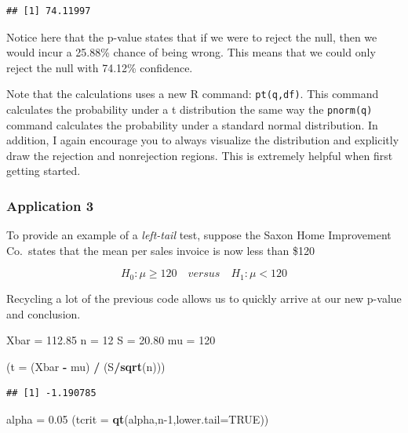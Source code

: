 \documentclass[
]{book}
\newenvironment{Shaded}{\begin{snugshade}}{\end{snugshade}}
\newcommand{\AttributeTok}[1]{\textcolor[rgb]{0.13,0.29,0.53}{#1}}
\newcommand{\ConstantTok}[1]{\textcolor[rgb]{0.56,0.35,0.01}{#1}}
\newcommand{\DecValTok}[1]{\textcolor[rgb]{0.00,0.00,0.81}{#1}}
\newcommand{\FloatTok}[1]{\textcolor[rgb]{0.00,0.00,0.81}{#1}}
\newcommand{\FunctionTok}[1]{\textcolor[rgb]{0.13,0.29,0.53}{\textbf{#1}}}
\newcommand{\NormalTok}[1]{#1}
\newcommand{\OtherTok}[1]{\textcolor[rgb]{0.56,0.35,0.01}{#1}}
\newcommand{\SpecialCharTok}[1]{\textcolor[rgb]{0.81,0.36,0.00}{\textbf{#1}}}
\begin{document}
\begin{verbatim}
## [1] 74.11997
\end{verbatim}

Notice here that the p-value states that if we were to reject the null, then we would incur a 25.88\% chance of being wrong. This means that we could only reject the null with 74.12\% confidence.

Note that the calculations uses a new R command: \texttt{pt(q,df)}. This command calculates the probability under a t distribution the same way the \texttt{pnorm(q)} command calculates the probability under a standard normal distribution. In addition, I again encourage you to always visualize the distribution and explicitly draw the rejection and nonrejection regions. This is extremely helpful when first getting started.

\subsubsection*{Application 3}\label{application-3-1}

To provide an example of a \emph{left-tail} test, suppose the Saxon Home Improvement Co.~states that the mean per sales invoice is now less than \$120

\[H_0:\mu \geq 120 \quad versus \quad H_1:\mu < 120\]

Recycling a lot of the previous code allows us to quickly arrive at our new p-value and conclusion.

\begin{Shaded}
\begin{Highlighting}[]
\NormalTok{Xbar }\OtherTok{=} \FloatTok{112.85}
\NormalTok{n }\OtherTok{=} \DecValTok{12}
\NormalTok{S }\OtherTok{=} \FloatTok{20.80}
\NormalTok{mu }\OtherTok{=} \DecValTok{120}

\NormalTok{(}\AttributeTok{t =}\NormalTok{ (Xbar }\SpecialCharTok{{-}}\NormalTok{ mu) }\SpecialCharTok{/}\NormalTok{ (S}\SpecialCharTok{/}\FunctionTok{sqrt}\NormalTok{(n)))}
\end{Highlighting}
\end{Shaded}

\begin{verbatim}
## [1] -1.190785
\end{verbatim}

\begin{Shaded}
\begin{Highlighting}[]
\NormalTok{alpha }\OtherTok{=} \FloatTok{0.05}
\NormalTok{(}\AttributeTok{tcrit =} \FunctionTok{qt}\NormalTok{(alpha,n}\DecValTok{{-}1}\NormalTok{,}\AttributeTok{lower.tail=}\ConstantTok{TRUE}\NormalTok{))}
\end{Highlighting}
\end{Shaded}
\end{document}
